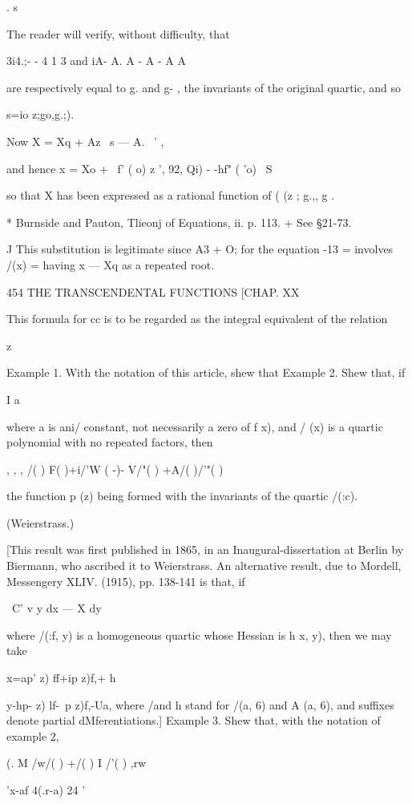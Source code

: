 {. s

The reader will verify, without difficulty, that

3i4.;- - 4 1 3 and iA- A. A - A - A A

are respectively equal to g. and g- , the invariants of the original
quartic, and so

s=io z;go,g.;).

Now X = Xq + Az \ s — A. ~' ,

and hence x = Xo + \ f' ( o) z ', 92, Qi) - -hf" ( 'o) ~S

so that X has been expressed as a rational function of ( (z ; g.,, g .

* Burnside and Pauton, Tlieonj of Equations, ii. p. 113. + See §21-73.

J This substitution is legitimate since A3 + O; for the equation -13 =
involves /(x) = having x — Xq as a repeated root.

454 THE TRANSCENDENTAL FUNCTIONS [CHAP. XX

This formula for cc is to be regarded as the integral equivalent of
the relation

z

Example 1. With the notation of this article, shew that Example 2.
Shew that, if

I a

where a is ani/ constant, not necessarily a zero of f x), and / (x) is
a quartic polynomial with no repeated factors, then

, , , /( ) F( )+i/'W ( -)- V/"( ) +A/( )/'"( )

the function p (z) being formed with the invariants of the quartic
/(:c).

(Weierstrass.)

[This result was first published in 1865, in an Inaugural-dissertation
at Berlin by Biermann, who ascribed it to Weierstrass. An alternative
result, due to Mordell, Messengery XLIV. (1915), pp. 138-141 is that,
if

\ C' v y dx — X dy

where /(:f, y) is a homogeneous quartic whose Hessian is h x, y), then
we may take

x=ap' z) ff+ip z)f,+ h

y-hp- z) lf-\ p z)f,-Ua, where /and h stand for /(a, 6) and A (a, 6),
and suffixes denote partial dMferentiations.] Example 3. Shew that,
with the notation of example 2,

(. M /w/( ) +/( ) I /'( ) ,rw

 'x-af 4(.r-a) 24 '

}
